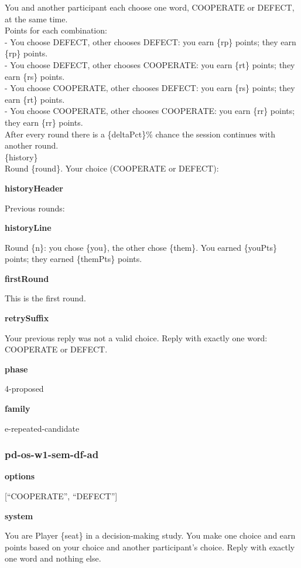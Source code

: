 \documentclass[11pt]{article}
\begin{document}
You and another participant each choose one word, COOPERATE or DEFECT,
at the same time.\\
Points for each combination:\\
- You choose DEFECT, other chooses DEFECT: you earn \{rp\} points; they
earn \{rp\} points.\\
- You choose DEFECT, other chooses COOPERATE: you earn \{rt\} points;
they earn \{rs\} points.\\
- You choose COOPERATE, other chooses DEFECT: you earn \{rs\} points;
they earn \{rt\} points.\\
- You choose COOPERATE, other chooses COOPERATE: you earn \{rr\} points;
they earn \{rr\} points.\\
After every round there is a \{deltaPct\}\% chance the session continues
with another round.\\

\{history\}\\

Round \{round\}. Your choice (COOPERATE or DEFECT):

\textbf{historyHeader}

Previous rounds:

\textbf{historyLine}

Round \{n\}: you chose \{you\}, the other chose \{them\}. You earned
\{youPts\} points; they earned \{themPts\} points.

\textbf{firstRound}

This is the first round.

\textbf{retrySuffix}

Your previous reply was not a valid choice. Reply with exactly one word:
COOPERATE or DEFECT.

\textbf{phase}

4-proposed

\textbf{family}

e-repeated-candidate

\subsubsection{pd-os-w1-sem-df-ad}\label{pd-os-w1-sem-df-ad}

\textbf{options}

{[}``COOPERATE'', ``DEFECT''{]}

\textbf{system}

You are Player \{seat\} in a decision-making study. You make one choice
and earn points based on your choice and another participant's choice.
Reply with exactly one word and nothing else.
\end{document}
